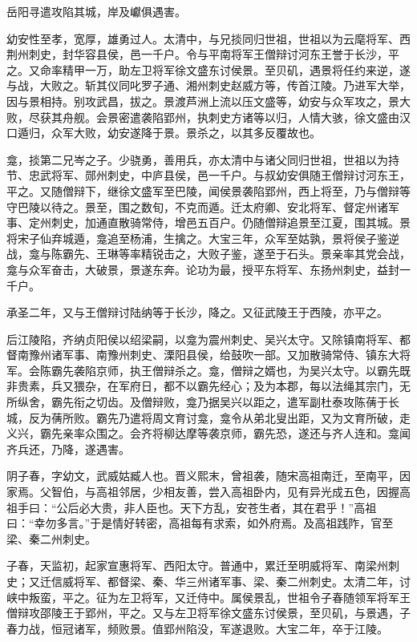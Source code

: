 \documentclass[12pt,UTF8]{ctexbook}
\begin{document}
岳阳寻遣攻陷其城，岸及巘俱遇害。

幼安性至孝，宽厚，雄勇过人。太清中，与兄掞同归世祖，世祖以为云麾将军、西荆州刺史，封华容县侯，邑一千户。令与平南将军王僧辩讨河东王誉于长沙，平之。又命率精甲一万，助左卫将军徐文盛东讨侯景。至贝矶，遇景将任约来逆，遂与战，大败之。斩其仪同叱罗子通、湘州刺史赵威方等，传首江陵。乃进军大举，因与景相持。别攻武昌，拔之。景渡芦洲上流以压文盛等，幼安与众军攻之，景大败，尽获其舟舰。会景密遣袭陷郢州，执刺史方诸等以归，人情大骇，徐文盛由汉口遁归，众军大败，幼安遂降于景。景杀之，以其多反覆故也。

龛，掞第二兄岑之子。少骁勇，善用兵，亦太清中与诸父同归世祖，世祖以为持节、忠武将军、郧州刺史，中庐县侯，邑一千户。与叔幼安俱随王僧辩讨河东王，平之。又随僧辩下，继徐文盛军至巴陵，闻侯景袭陷郢州，西上将至，乃与僧辩等守巴陵以待之。景至，围之数旬，不克而遁。迁太府卿、安北将军、督定州诸军事、定州刺史，加通直散骑常侍，增邑五百户。仍随僧辩追景至江夏，围其城。景将宋子仙弃城遁，龛追至杨浦，生擒之。大宝三年，众军至姑孰，景将侯子鉴逆战，龛与陈霸先、王琳等率精锐击之，大败子鉴，遂至于石头。景亲率其党会战，龛与众军奋击，大破景，景遂东奔。论功为最，授平东将军、东扬州刺史，益封一千户。

承圣二年，又与王僧辩讨陆纳等于长沙，降之。又征武陵王于西陵，亦平之。

后江陵陷，齐纳贞阳侯以绍梁嗣，以龛为震州刺史、吴兴太守。又除镇南将军、都督南豫州诸军事、南豫州刺史、溧阳县侯，给鼓吹一部。又加散骑常侍、镇东大将军。会陈霸先袭陷京师，执王僧辩杀之。龛，僧辩之婿也，为吴兴太守。以霸先既非贵素，兵又猥杂，在军府日，都不以霸先经心；及为本郡，每以法绳其宗门，无所纵舍，霸先衔之切齿。及僧辩败，龛乃据吴兴以距之，遣军副杜泰攻陈蒨于长城，反为蒨所败。霸先乃遣将周文育讨龛，龛令从弟北叟出距，又为文育所破，走义兴，霸先亲率众围之。会齐将柳达摩等袭京师，霸先恐，遂还与齐人连和。龛闻齐兵还，乃降，遂遇害。

阴子春，字幼文，武威姑臧人也。晋义熙末，曾祖袭，随宋高祖南迁，至南平，因家焉。父智伯，与高祖邻居，少相友善，尝入高祖卧内，见有异光成五色，因握高祖手曰：“公后必大贵，非人臣也。天下方乱，安苍生者，其在君乎！”高祖曰：“幸勿多言。”于是情好转密，高祖每有求索，如外府焉。及高祖践阼，官至梁、秦二州刺史。

子春，天监初，起家宣惠将军、西阳太守。普通中，累迁至明威将军、南梁州刺史；又迁信威将军、都督梁、秦、华三州诸军事、梁、秦二州刺史。太清二年，讨峡中叛蛮，平之。征为左卫将军，又迁侍中。属侯景乱，世祖令子春随领军将军王僧辩攻邵陵王于郢州，平之。又与左卫将军徐文盛东讨侯景，至贝矶，与景遇，子春力战，恒冠诸军，频败景。值郢州陷没，军遂退败。大宝二年，卒于江陵。
\end{document}
